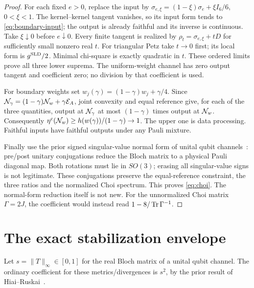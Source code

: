 \begin{proof}
For each fixed \(e>0\), replace the input by
\(\sigma_{e,\xi}=(1-\xi)\sigma_e+\xi I_6/6\), \(0<\xi<1\).
The kernel--kernel tangent vanishes, so its input form tends to \eqref{eq:boundary-input}; the output is already faithful and its inverse is continuous. Take \(\xi\downarrow0\) before \(e\downarrow0\).
Every finite tangent is realized by \(\rho_t=\sigma_{e,\xi}+tD\) for sufficiently small nonzero real \(t\). For triangular Petz take \(t\to0\) first; its local form is \(g^{\rm SLD}/2\). Minimal chi-square is exactly quadratic in \(t\). These ordered limits prove all three lower suprema. The uniform-weight channel has zero output tangent and coefficient zero; no division by that coefficient is used.

For boundary weights set \(w_j(\gamma)=(1-\gamma)w_j+\gamma/4\).
Since \(\mathcal N_\gamma=(1-\gamma)\mathcal N_w+\gamma\mathcal E_A\), joint convexity and equal reference give, for each of the three quantities, output at \(\mathcal N_\gamma\) at most \((1-\gamma)\) times output at \(\mathcal N_w\). Consequently
\(\eta^c(\mathcal N_w)\ge h(w(\gamma))/(1-\gamma)\to1\). The upper one is data processing. Faithful inputs have faithful outputs under any Pauli mixture.

Finally use the prior signed singular-value normal form of unital qubit channels~\cite{RSW}: pre/post unitary conjugations reduce the Bloch matrix to a physical Pauli diagonal map. Both rotations must lie in \(SO(3)\); erasing all singular-value signs is not legitimate. These conjugations preserve the equal-reference constraint, the three ratios and the normalized Choi spectrum. This proves \eqref{eq:choi}. The normal-form reduction itself is not new. For the unnormalized Choi matrix \(\Gamma=2J\), the coefficient would instead read \(1-8/\operatorname{Tr}\Gamma^{-1}\).
\end{proof}

\section{The exact stabilization envelope}\label{sec:envelope}
Let \(s=\|T\|_\infty\in[0,1]\) for the real Bloch matrix of a unital qubit channel. The ordinary coefficient for these metrics/divergences is \(s^2\), by the prior result of Hiai--Ruskai~\cite[Theorem~6.1]{HR}.

